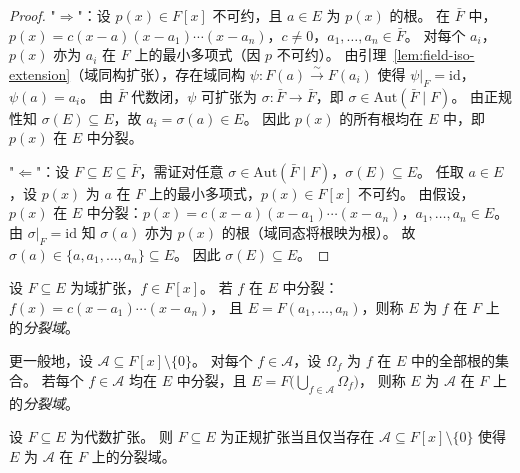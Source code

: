 \documentclass[lang=cn,a4paper,newtx]{elegantbook}
\begin{document}
\begin{proof}
  "$\Rightarrow$"：设 $p(x)\in F[x]$ 不可约，且 $a\in E$ 为 $p(x)$ 的根。
  在 $\bar F$ 中，$p(x)=c(x-a)(x-a_1)\cdots(x-a_n)$，$c\ne 0$，$a_1,\dots,a_n\in\bar F$。
  对每个 $a_i$，$p(x)$ 亦为 $a_i$ 在 $F$ 上的最小多项式（因 $p$ 不可约）。
  由引理~\ref{lem:field-iso-extension}（域同构扩张），存在域同构 $\psi\colon F(a)\xrightarrow{\sim} F(a_i)$ 使得 $\psi\big|_F=\mathrm{id}$，$\psi(a)=a_i$。
  由 $\bar F$ 代数闭，$\psi$ 可扩张为 $\sigma\colon\bar F\to\bar F$，即 $\sigma\in\mathrm{Aut}(\bar F\mid F)$。
  由正规性知 $\sigma(E)\subseteq E$，故 $a_i=\sigma(a)\in E$。
  因此 $p(x)$ 的所有根均在 $E$ 中，即 $p(x)$ 在 $E$ 中分裂。

  "$\Leftarrow$"：设 $F\subseteq E\subseteq\bar F$，需证对任意 $\sigma\in\mathrm{Aut}(\bar F\mid F)$，$\sigma(E)\subseteq E$。
  任取 $a\in E$，设 $p(x)$ 为 $a$ 在 $F$ 上的最小多项式，$p(x)\in F[x]$ 不可约。
  由假设，$p(x)$ 在 $E$ 中分裂：$p(x)=c(x-a)(x-a_1)\cdots(x-a_n)$，$a_1,\dots,a_n\in E$。
  由 $\sigma\big|_F=\mathrm{id}$ 知 $\sigma(a)$ 亦为 $p(x)$ 的根（域同态将根映为根）。
  故 $\sigma(a)\in\{a,a_1,\dots,a_n\}\subseteq E$。
  因此 $\sigma(E)\subseteq E$。
\end{proof}

\begin{definition}[分裂域]
  设 $F\subseteq E$ 为域扩张，$f\in F[x]$。
  若 $f$ 在 $E$ 中分裂：$f(x)=c(x-a_1)\cdots(x-a_n)$，
  且 $E=F(a_1,\dots,a_n)$，则称 $E$ 为 $f$ 在 $F$ 上的\emph{分裂域}。

  更一般地，设 $\mathcal{A}\subseteq F[x]\setminus\{0\}$。
  对每个 $f\in\mathcal{A}$，设 $\Omega_f$ 为 $f$ 在 $E$ 中的全部根的集合。
  若每个 $f\in\mathcal{A}$ 均在 $E$ 中分裂，且 $E=F\bigl(\bigcup_{f\in\mathcal{A}}\Omega_f\bigr)$，
  则称 $E$ 为 $\mathcal{A}$ 在 $F$ 上的\emph{分裂域}。
\end{definition}

\begin{theorem}
  设 $F\subseteq E$ 为代数扩张。
  则 $F\subseteq E$ 为正规扩张当且仅当存在 $\mathcal{A}\subseteq F[x]\setminus\{0\}$ 使得 $E$ 为 $\mathcal{A}$ 在 $F$ 上的分裂域。
\end{theorem}
\end{document}
